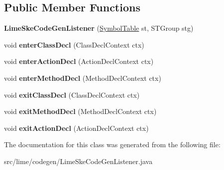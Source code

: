 \subsection*{Public Member Functions}
\begin{DoxyCompactItemize}
\item 
\mbox{\label{classlime_1_1codegen_1_1LimeSkeCodeGenListener_ab8f88655b019f6a4fe27f9d1f9075956}} 
{\bfseries Lime\+Ske\+Code\+Gen\+Listener} (\hyperlink{classlime_1_1antlr4_1_1SymbolTable}{Symbol\+Table} st, S\+T\+Group stg)
\item 
\mbox{\label{classlime_1_1codegen_1_1LimeSkeCodeGenListener_a63a8c969af0ab13db170745841d61ea6}} 
void {\bfseries enter\+Class\+Decl} (Class\+Decl\+Context ctx)
\item 
\mbox{\label{classlime_1_1codegen_1_1LimeSkeCodeGenListener_a6af368640cf2e9bb3e6ce8e71ceb0d2f}} 
void {\bfseries enter\+Action\+Decl} (Action\+Decl\+Context ctx)
\item 
\mbox{\label{classlime_1_1codegen_1_1LimeSkeCodeGenListener_a1f8762af82b9637f34e07a4dd19d604a}} 
void {\bfseries enter\+Method\+Decl} (Method\+Decl\+Context ctx)
\item 
\mbox{\label{classlime_1_1codegen_1_1LimeSkeCodeGenListener_a32015158a6d7849a051f67e38d34bd84}} 
void {\bfseries exit\+Class\+Decl} (Class\+Decl\+Context ctx)
\item 
\mbox{\label{classlime_1_1codegen_1_1LimeSkeCodeGenListener_a2e8178e1a7aa817b968891b43536037d}} 
void {\bfseries exit\+Method\+Decl} (Method\+Decl\+Context ctx)
\item 
\mbox{\label{classlime_1_1codegen_1_1LimeSkeCodeGenListener_a1801fffd10b9afb079ba3ba0208fd288}} 
void {\bfseries exit\+Action\+Decl} (Action\+Decl\+Context ctx)
\end{DoxyCompactItemize}


The documentation for this class was generated from the following file\+:\begin{DoxyCompactItemize}
\item 
src/lime/codegen/Lime\+Ske\+Code\+Gen\+Listener.\+java\end{DoxyCompactItemize}
